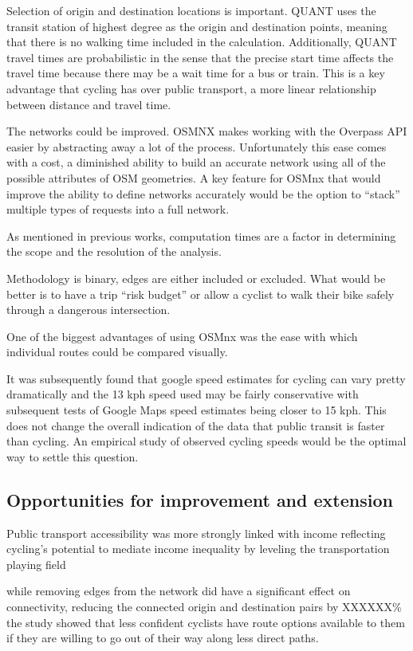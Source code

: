 Selection of origin and destination locations is important. QUANT uses the transit station of highest degree as the origin and destination points, meaning that there is no walking time included in the calculation. Additionally, QUANT travel times are probabilistic in the sense that the precise start time affects the travel time because there may be a wait time for a bus or train. This is a key advantage that cycling has over public transport, a more linear relationship between distance and travel time. 

The networks could be improved. OSMNX makes working with the Overpass API easier by abstracting away a lot of the process. Unfortunately this ease comes with a cost, a diminished ability to build an accurate network using all of the possible attributes of OSM geometries. A key feature for OSMnx that would improve the ability to define networks accurately would be the option to ``stack'' multiple types of requests into a full network.  

As mentioned in previous works, computation times are a factor in determining the scope and the resolution of the analysis. 

Methodology is binary, edges are either included or excluded. What would be better is to have a trip ``risk budget''  or allow a cyclist to walk their bike safely through a dangerous intersection. 

One of the biggest advantages of using OSMnx was the ease with which individual routes could be compared visually. 

It was subsequently found that google speed estimates for cycling can vary pretty dramatically and the 13 kph speed used may be fairly conservative with subsequent tests of Google Maps speed estimates being closer to 15 kph. This does not change the overall indication of the data that public transit is faster than cycling. An empirical study of observed cycling speeds would be the optimal way to settle this question. 

\subsection{Opportunities for improvement and extension}

Public transport accessibility was more strongly linked with income reflecting cycling's potential to mediate income inequality by leveling the transportation playing field

while removing edges from the network did have a significant effect on connectivity, reducing the connected origin and destination pairs by XXXXXX\% the study showed that less confident cyclists have route options available to them if they are willing to go out of their way along less direct paths. 



